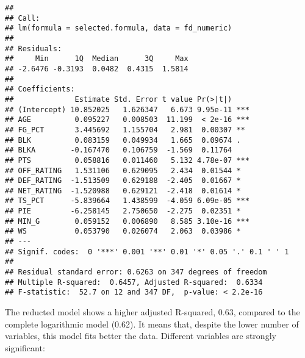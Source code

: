 \documentclass[
]{article}
\begin{document}
\begin{verbatim}
## 
## Call:
## lm(formula = selected.formula, data = fd_numeric)
## 
## Residuals:
##     Min      1Q  Median      3Q     Max 
## -2.6476 -0.3193  0.0482  0.4315  1.5814 
## 
## Coefficients:
##              Estimate Std. Error t value Pr(>|t|)    
## (Intercept) 10.852025   1.626347   6.673 9.95e-11 ***
## AGE          0.095227   0.008503  11.199  < 2e-16 ***
## FG_PCT       3.445692   1.155704   2.981  0.00307 ** 
## BLK          0.083159   0.049934   1.665  0.09674 .  
## BLKA        -0.167470   0.106759  -1.569  0.11764    
## PTS          0.058816   0.011460   5.132 4.78e-07 ***
## OFF_RATING   1.531106   0.629095   2.434  0.01544 *  
## DEF_RATING  -1.513509   0.629188  -2.405  0.01667 *  
## NET_RATING  -1.520988   0.629121  -2.418  0.01614 *  
## TS_PCT      -5.839664   1.438599  -4.059 6.09e-05 ***
## PIE         -6.258145   2.750650  -2.275  0.02351 *  
## MIN_G        0.059152   0.006890   8.585 3.10e-16 ***
## WS           0.053790   0.026074   2.063  0.03986 *  
## ---
## Signif. codes:  0 '***' 0.001 '**' 0.01 '*' 0.05 '.' 0.1 ' ' 1
## 
## Residual standard error: 0.6263 on 347 degrees of freedom
## Multiple R-squared:  0.6457, Adjusted R-squared:  0.6334 
## F-statistic:  52.7 on 12 and 347 DF,  p-value: < 2.2e-16
\end{verbatim}

The reducted model shows a higher adjusted R-squared, 0.63, compared to
the complete logarithmic model (0.62). It means that, despite the lower
number of variables, this model fits better the data. Different
variables are strongly significant:
\end{document}
